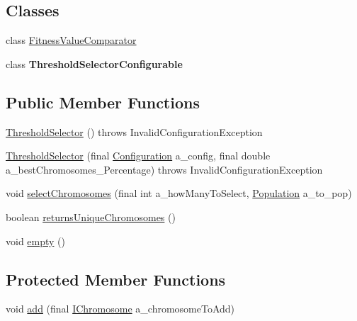 \subsection*{Classes}
\begin{DoxyCompactItemize}
\item 
class \hyperlink{classorg_1_1jgap_1_1impl_1_1_threshold_selector_1_1_fitness_value_comparator}{Fitness\-Value\-Comparator}
\item 
class {\bfseries Threshold\-Selector\-Configurable}
\end{DoxyCompactItemize}
\subsection*{Public Member Functions}
\begin{DoxyCompactItemize}
\item 
\hyperlink{classorg_1_1jgap_1_1impl_1_1_threshold_selector_ae1c215671de0da1dc9757868e17033bf}{Threshold\-Selector} ()  throws Invalid\-Configuration\-Exception 
\item 
\hyperlink{classorg_1_1jgap_1_1impl_1_1_threshold_selector_ad84f60978e742f2e3e1eadb5ed216f73}{Threshold\-Selector} (final \hyperlink{classorg_1_1jgap_1_1_configuration}{Configuration} a\-\_\-config, final double a\-\_\-best\-Chromosomes\-\_\-\-Percentage)  throws Invalid\-Configuration\-Exception 
\item 
void \hyperlink{classorg_1_1jgap_1_1impl_1_1_threshold_selector_a0503b950969a0c79b42963391ca131f5}{select\-Chromosomes} (final int a\-\_\-how\-Many\-To\-Select, \hyperlink{classorg_1_1jgap_1_1_population}{Population} a\-\_\-to\-\_\-pop)
\item 
boolean \hyperlink{classorg_1_1jgap_1_1impl_1_1_threshold_selector_a893b221b556725744ffa735e54df2eb0}{returns\-Unique\-Chromosomes} ()
\item 
void \hyperlink{classorg_1_1jgap_1_1impl_1_1_threshold_selector_ad39ffedc3c37177fea2475bf8c70cdfe}{empty} ()
\end{DoxyCompactItemize}
\subsection*{Protected Member Functions}
\begin{DoxyCompactItemize}
\item 
void \hyperlink{classorg_1_1jgap_1_1impl_1_1_threshold_selector_ae91ab1838f89d6e53cad5822947e253d}{add} (final \hyperlink{interfaceorg_1_1jgap_1_1_i_chromosome}{I\-Chromosome} a\-\_\-chromosome\-To\-Add)
\end{DoxyCompactItemize}
